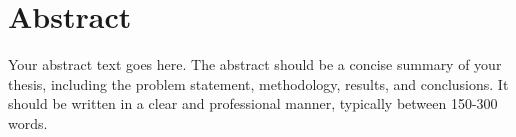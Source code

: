 \chapter*{Abstract}

Your abstract text goes here. The abstract should be a concise summary of your thesis,
including the problem statement, methodology, results, and conclusions. It should be
written in a clear and professional manner, typically between 150-300 words.

